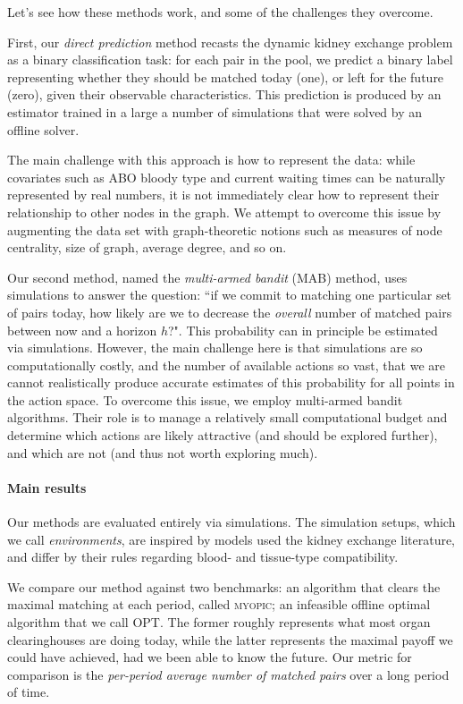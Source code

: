 Let's see how these methods work, and some of the challenges they overcome.

First, our \emph{direct prediction} method recasts the dynamic kidney exchange problem as a binary classification task: for each pair in the pool, we predict a binary label representing whether they should be matched today (one), or left for the future (zero), given their observable characteristics. This prediction is produced by an estimator trained in a large a number of simulations that were solved by an offline solver.

The main challenge with this approach is how to represent the data: while covariates such as ABO bloody type and current waiting times can be naturally represented by real numbers, it is not immediately clear how to represent their relationship to other nodes in the graph.  We attempt to overcome this issue by augmenting the data set with graph-theoretic notions such as measures of node centrality, size of graph, average degree, and so on. 

Our second method, named the \emph{multi-armed bandit} (MAB) method, uses simulations to answer the question: ``if we commit to matching one particular set of pairs today, how likely are we to decrease the \emph{overall} number of matched pairs between now and a horizon $h$?". This probability can in principle be estimated via simulations. However, the main challenge here is that simulations are so computationally costly, and the number of available actions so vast, that we are cannot realistically produce accurate estimates of this probability for all points in the action space. To overcome this issue, we employ multi-armed bandit algorithms. Their role is to manage a relatively small computational budget and determine which actions are likely attractive (and should be explored further), and which are not (and thus not worth exploring much).


\paragraph{\textbf{Main results}} Our methods are evaluated entirely via simulations. The simulation setups, which we call \emph{environments}, are inspired by models used the kidney exchange literature, and differ by their rules regarding blood- and tissue-type compatibility.

We compare our method against two benchmarks: an algorithm that clears the maximal matching at each period, called \textsc{myopic}; an infeasible offline optimal algorithm that we call \textsc{OPT}. The former roughly represents what most organ clearinghouses are doing today, while the latter represents the maximal payoff we could have achieved, had we been able to know the future. Our metric for comparison is the \emph{per-period average number of matched pairs} over a long period of time.

